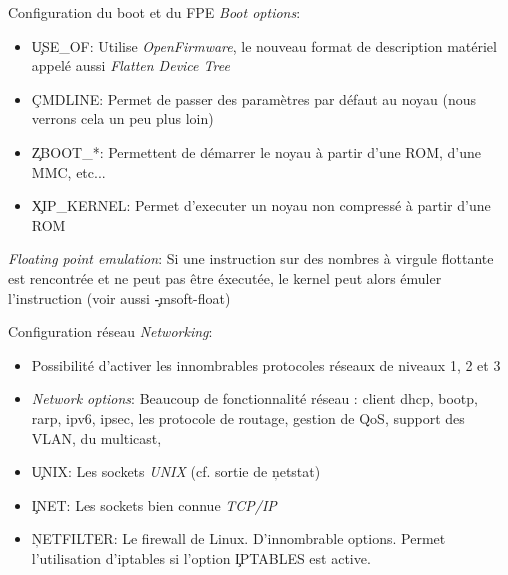 \begin{frame}[fragile=singleslide]{Configuration du boot et du FPE}
  \emph{Boot options}:
  \begin{itemize}
  \item \c{USE_OF}: Utilise  \emph{OpenFirmware}, le nouveau format de
    description matériel appelé aussi \emph{Flatten Device Tree}
  \item  \c{CMDLINE}: Permet de  passer des  paramètres par  défaut au
    noyau (nous verrons cela un peu plus loin)
  \item \c{ZBOOT_*}:  Permettent de démarrer  le noyau à  partir d'une
    ROM, d'une MMC, etc...
  \item  \c{XIP_KERNEL}: Permet  d'executer un  noyau non  compressé à
    partir d'une ROM
  \end{itemize}
  \emph{Floating point emulation}: Si  une instruction sur des nombres
  à virgule flottante est rencontrée  et ne peut pas être éxecutée, le
  kernel peut alors émuler l'instruction (voir aussi \c{-msoft-float})
\end{frame}

\begin{frame}[fragile=singleslide]{Configuration réseau}
  \emph{Networking}:
  \begin{itemize}
  \item Possibilité d'activer les innombrables protocoles réseaux de
    niveaux 1, 2 et 3
  \item  \emph{Network options}: Beaucoup  de fonctionnalité  réseau :
    client dhcp, bootp, rarp, ipv6, ipsec, les protocole de routage,
    gestion de QoS, support des VLAN, du multicast,
  \item \c{UNIX}: Les sockets \emph{UNIX} (cf. sortie de \c{netstat})
  \item \c{INET}: Les sockets bien connue \emph{TCP/IP}
  \item \c{NETFILTER}: Le  firewall de Linux.  D'innombrable options.
    Permet  l'utilisation d'iptables  si  l'option \c{IPTABLES}  est
    active.
  \end{itemize} 
\end{frame}

